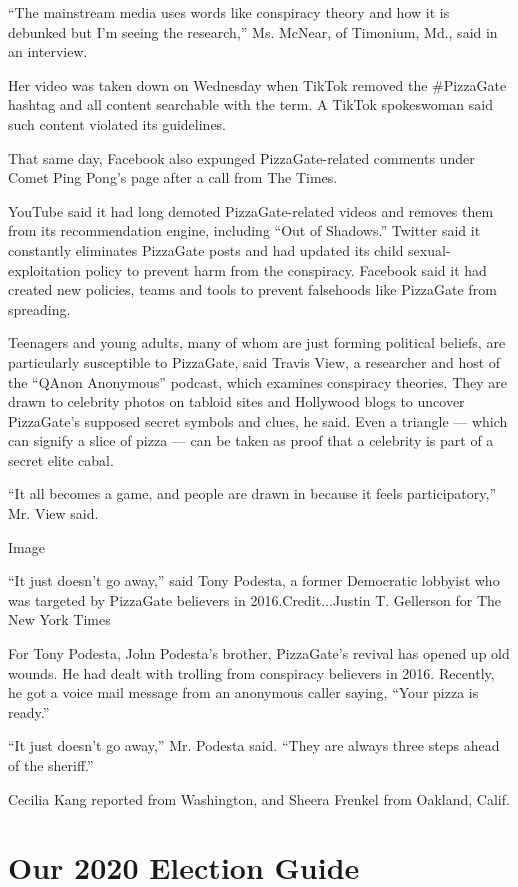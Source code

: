 ``The mainstream media uses words like conspiracy theory and how it is
debunked but I'm seeing the research,'' Ms. McNear, of Timonium, Md.,
said in an interview.

Her video was taken down on Wednesday when TikTok removed the
\#PizzaGate hashtag and all content searchable with the term. A TikTok
spokeswoman said such content violated its guidelines.

That same day, Facebook also expunged PizzaGate-related comments under
Comet Ping Pong's page after a call from The Times.

YouTube said it had long demoted PizzaGate-related videos and removes
them from its recommendation engine, including ``Out of Shadows.''
Twitter said it constantly eliminates PizzaGate posts and had updated
its child sexual-exploitation policy to prevent harm from the
conspiracy. Facebook said it had created new policies, teams and tools
to prevent falsehoods like PizzaGate from spreading.

Teenagers and young adults, many of whom are just forming political
beliefs, are particularly susceptible to PizzaGate, said Travis View, a
researcher and host of the ``QAnon Anonymous'' podcast, which examines
conspiracy theories. They are drawn to celebrity photos on tabloid sites
and Hollywood blogs to uncover PizzaGate's supposed secret symbols and
clues, he said. Even a triangle --- which can signify a slice of pizza
--- can be taken as proof that a celebrity is part of a secret elite
cabal.

``It all becomes a game, and people are drawn in because it feels
participatory,'' Mr. View said.

Image

``It just doesn't go away,'' said Tony Podesta, a former Democratic
lobbyist who was targeted by PizzaGate believers in 2016.Credit...Justin
T. Gellerson for The New York Times

For Tony Podesta, John Podesta's brother, PizzaGate's revival has opened
up old wounds. He had dealt with trolling from conspiracy believers in
2016. Recently, he got a voice mail message from an anonymous caller
saying, ``Your pizza is ready.''

``It just doesn't go away,'' Mr. Podesta said. ``They are always three
steps ahead of the sheriff.''

Cecilia Kang reported from Washington, and Sheera Frenkel from Oakland,
Calif.

\hypertarget{our-2020-election-guide}{%
\section{Our 2020 Election Guide}\label{our-2020-election-guide}}

